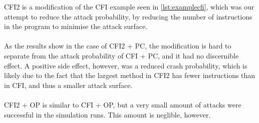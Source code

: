 CFI2 is a modification of the CFI example seen in \cref{lst:examplecfi}, which was our attempt to reduce the attack probability, by reducing the number of instructions in the program to minimise the attack surface.\\\\
As the results show in the case of CFI2 + PC, the modification is hard to separate from the attack probability of CFI + PC, and it had no discernible effect. A positive side effect, however, was a reduced crash probability, which is likely due to the fact that the largest method in CFI2 has fewer instructions than in CFI, and thus a smaller attack surface.\\\\
CFI2 + OP is similar to CFI + OP, but a very small amount of attacks were successful in the simulation runs. This amount is neglible, however.